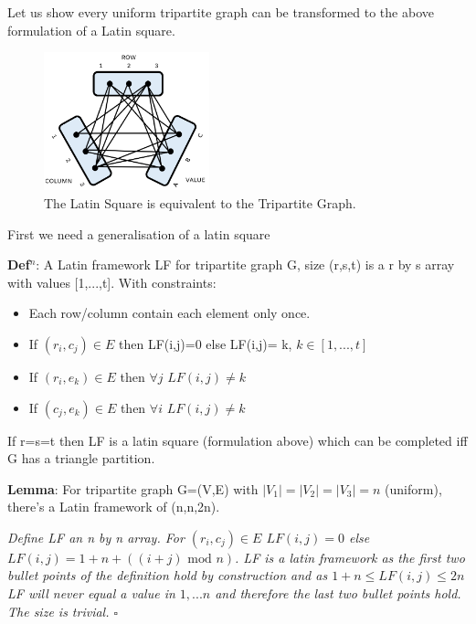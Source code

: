 \documentclass[a4paper,11pt]{report}
\newcounter{row}
\newcounter{col}
\newcounter{rowb}
\newcounter{colb}
\newcommand\setrowb[3]{
  \setcounter{colb}{1}
  \foreach \n in {#1, #2, #3} {
    \edef\x{\value{colb} - 0.5}
    \edef\y{3.5 - \value{rowb}}
    \node[anchor=center] at (\x, \y) {\n};
    \stepcounter{colb}
  }
  \stepcounter{rowb}
}
\begin{document}
Let us show every uniform tripartite graph can be transformed to the above formulation of a Latin square.

\begin{figure}[h!]
\centering
{}

\includegraphics[height=40mm]{figures/ttg.png}
\caption{The Latin Square is equivalent to the Tripartite Graph.}
\end{figure}

First we need a generalisation of a latin square

\textbf{Def$^n$}: A Latin framework LF for tripartite graph G, size (r,s,t) is a r by s array with values [1,...,t]. With constraints:
\begin{itemize}
\item{Each row/column contain each element only once.}
\item{If $(r_i,c_j)\in E$ then LF(i,j)=0 else LF(i,j)= k, $k\in [1,...,t]$}
\item{If $(r_i,e_k)\in E$  then $\forall j$ $LF(i,j)\neq k$}
\item{If $(c_j,e_k)\in E$  then $\forall i$ $LF(i,j)\neq k$}
\end{itemize}
If r=s=t then LF is a latin square (formulation above) which can be completed iff G has a triangle partition.

\textbf{Lemma}: For tripartite graph G=(V,E) with $|V_1|=|V_2|=|V_3|=n$ (uniform), there's a Latin framework of (n,n,2n).

\textit{Define LF an n by n array. For $(r_i,c_j)\in E$ $LF(i,j)=0$ else $LF(i,j)=1+n+((i+j)\text{ mod }n)$. LF is a latin framework as the first two bullet points of the definition hold by construction and as $1+n\leq LF(i,j)\leq 2n$ LF will never equal a value in $1,...n$ and therefore the last two bullet points hold. The size is trivial. $\square$}
\end{document}
